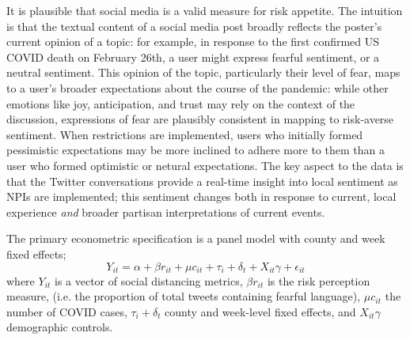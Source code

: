 \documentclass{article}
\begin{document}
It is plausible that social media is a valid measure for risk appetite. The intuition is that the textual content of a social media post broadly reflects the poster's current opinion of a topic: for example, in response to the first confirmed US COVID death on February 26th, a user might express fearful sentiment, or a neutral sentiment. This opinion of the topic, particularly their level of fear, maps to a user's broader expectations about the course of the pandemic: while other emotions like joy, anticipation, and trust may rely on the context of the discussion, expressions of fear are plausibly consistent in mapping to risk-averse sentiment. When restrictions are implemented, users who initially formed pessimistic expectations may be more inclined to adhere more to them than a user who formed optimistic or netural expectations. The key aspect to the data is that the Twitter conversations provide a real-time insight into local sentiment as NPIs are implemented; this sentiment changes both in response to current, local experience \textit{and} broader partisan interpretations of current events.

The primary econometric specification is a panel model with county and week fixed effects;
\[Y_{it} = \alpha + \beta r_{it} + \mu c_{it} + \tau_i + \delta_t +  X_{it}\gamma + \epsilon_{it}\]
where \(Y_{it}\) is a vector of social distancing metrics, \(\beta r_{it}\) is the risk perception measure, (i.e. the proportion of total tweets containing fearful language), \(\mu c_{it}\) the number of COVID cases, \(\tau_i + \delta_t\) county and week-level fixed effects, and \(X_{it}\gamma\) demographic controls.
\end{document}
